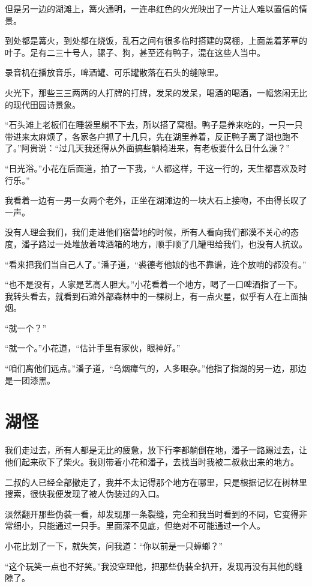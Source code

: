 但是另一边的湖滩上，篝火通明，一连串红色的火光映出了一片让人难以置信的情景。

到处都是篝火，到处都在烧饭，乱石之间有很多临时搭建的窝棚，上面盖着茅草的叶子。足有二三十号人，骡子、狗，甚至还有鸭子，混在这些人当中。

录音机在播放音乐，啤酒罐、可乐罐散落在石头的缝隙里。

火光下，那些三三两两的人打牌的打牌，发呆的发呆，喝酒的喝酒，一幅悠闲无比的现代田园诗景象。

“石头滩上老板们在睡袋里躺不下去，所以搭了窝棚。鸭子是养来吃的，一只一只带进来太麻烦了，各家各户抓了十几只，先在湖里养着，反正鸭子离了湖也跑不了。”阿贵说：“过几天我还得从外面搞些躺椅进来，有老板要什么日什么澡？”

“日光浴。”小花在后面道，拍了一下我，“人都这样，干这一行的，天生都喜欢及时行乐。”

我看着一边有一男一女两个老外，正坐在湖滩边的一块大石上接吻，不由得长叹了一声。

没有人理会我们，我们走进他们宿营地的时候，所有人看向我们都漠不关心的态度，潘子路过一处堆放着啤酒箱的地方，顺手顺了几罐甩给我们，也没有人抗议。

“看来把我们当自己人了。”潘子道，“裘德考他娘的也不靠谱，连个放哨的都没有。”

“也不是没有，人家是艺高人胆大。”小花看着一个地方，喝了一口啤酒指了一下。我转头看去，就看到石滩外部森林中的一棵树上，有一点火星，似乎有人在上面抽烟。

“就一个？”

“就一个。”小花道，“估计手里有家伙，眼神好。”

“咱们离他们远点。”潘子道，“乌烟瘴气的，人多眼杂。”他指了指湖的另一边，那边是一团漆黑。

\chapter{湖怪}

我们走过去，所有人都是无比的疲惫，放下行李都躺倒在地，潘子一路踢过去，让他们起来砍下了柴火。我则带着小花和潘子，去找当时我被二叔救出来的地方。

二叔的人已经全部撤走了，我并不太记得那个地方在哪里，只是根据记忆在树林里搜索，很快我便发现了被人伪装过的入口。

淡然翻开那些伪装一看，却发现那一条裂缝，完全和我当时看到的不同，它变得非常细小，只能通过一只手。里面深不见底，但绝对不可能通过一个人。

小花比划了一下，就失笑，问我道：“你以前是一只蟑螂？”

“这个玩笑一点也不好笑。”我没空理他，把那些伪装全扒开，发现再没有其他的缝隙了。

